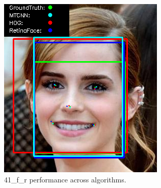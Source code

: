 \documentclass{l4proj}
\begin{document}
\begin{appendices}
\begin{figure}[h!]
\begin{minipage}{0.49\textwidth}
     \includegraphics[width=\textwidth]{images/appendix/41.png}
    \caption{41\_f\_r performance across algorithms.}
    \label{whoopi_result}
  \end{minipage}
\end{figure}


\end{appendices}
\end{document}
